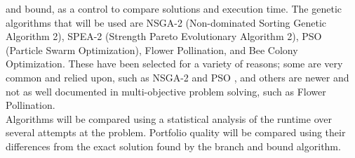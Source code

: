 \documentclass{article}
\begin{document}
and bound, as a control to compare solutions and execution time. The genetic algorithms that will be
used are NSGA-2 (Non-dominated Sorting Genetic Algorithm 2), SPEA-2 (Strength Pareto Evolutionary
Algorithm 2), PSO (Particle Swarm Optimization), Flower Pollination, and Bee Colony Optimization.
These have been selected for a variety of reasons; some are very common and relied upon, such as
NSGA-2 and PSO \cite{KaucicMoradiMirzazadeh}, and others are newer and not as well documented in multi-objective problem solving,
such as Flower Pollination. \cite{Yang} \\
Algorithms will be compared using a statistical analysis of the runtime over several attempts at the
problem. Portfolio quality will be compared using their differences from the exact solution found by
the branch and bound algorithm. \\

\printbibliography
\end{document}
